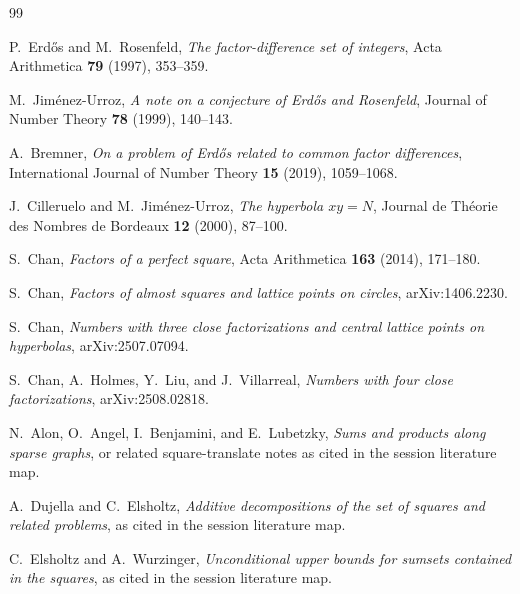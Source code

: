 \documentclass[11pt]{article}
\theoremstyle{plainbreak}
\theoremstyle{defbreak}
\begin{document}
\begin{thebibliography}{99}

P.~Erd\H{o}s and M.~Rosenfeld,
\emph{The factor-difference set of integers},
Acta Arithmetica \textbf{79} (1997), 353--359.

M.~Jim\'enez-Urroz,
\emph{A note on a conjecture of Erd\H{o}s and Rosenfeld},
Journal of Number Theory \textbf{78} (1999), 140--143.

A.~Bremner,
\emph{On a problem of Erd\H{o}s related to common factor differences},
International Journal of Number Theory \textbf{15} (2019), 1059--1068.

J.~Cilleruelo and M.~Jim\'enez-Urroz,
\emph{The hyperbola $xy=N$},
Journal de Th\'eorie des Nombres de Bordeaux \textbf{12} (2000), 87--100.

S.~Chan,
\emph{Factors of a perfect square},
Acta Arithmetica \textbf{163} (2014), 171--180.

S.~Chan,
\emph{Factors of almost squares and lattice points on circles},
arXiv:1406.2230.

S.~Chan,
\emph{Numbers with three close factorizations and central lattice points on hyperbolas},
arXiv:2507.07094.

S.~Chan, A.~Holmes, Y.~Liu, and J.~Villarreal,
\emph{Numbers with four close factorizations},
arXiv:2508.02818.

N.~Alon, O.~Angel, I.~Benjamini, and E.~Lubetzky,
\emph{Sums and products along sparse graphs},
or related square-translate notes as cited in the session literature map.

A.~Dujella and C.~Elsholtz,
\emph{Additive decompositions of the set of squares and related problems},
as cited in the session literature map.

C.~Elsholtz and A.~Wurzinger,
\emph{Unconditional upper bounds for sumsets contained in the squares},
as cited in the session literature map.

\end{thebibliography}
\end{document}
